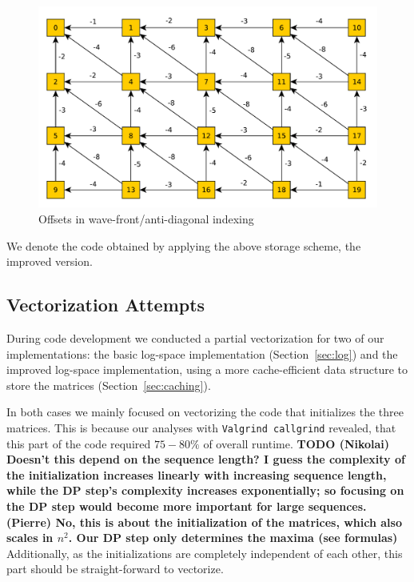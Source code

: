 \documentclass[runningheads,a4paper]{llncs}
\begin{document}
\begin{figure}
\centering
\includegraphics[scale=0.5]{images/unnamed0.pdf}
\caption{Offsets in wave-front/anti-diagonal indexing}
\label{fig:offset}
\end{figure}


We denote the code obtained by applying the above storage scheme, the improved version.

\subsection{Vectorization Attempts}
\label{sec:vector}
During code development we conducted a partial vectorization for two of our implementations: 
the basic log-space implementation (Section~\ref{sec:log}) and the improved log-space implementation, using a more 
cache-efficient data structure to store the matrices (Section~\ref{sec:caching}).

In both cases we mainly focused on vectorizing the code that initializes the three matrices. 
This is because our analyses with \texttt{Valgrind callgrind} revealed, that this 
part of the code required $75-80\%$ of overall runtime. 
\textbf{TODO (Nikolai) Doesn't this depend on the sequence length? I guess the
  complexity of the initialization increases linearly with increasing sequence length, while the
  DP step's complexity increases exponentially; so focusing on the DP step would
  become more important for large sequences. (Pierre) No, this is about the initialization of the matrices, which also scales in $n^2$. Our DP step only determines the maxima (see formulas)}
Additionally, as the initializations are completely independent of each other, this part should be straight-forward to vectorize.
\end{document}
